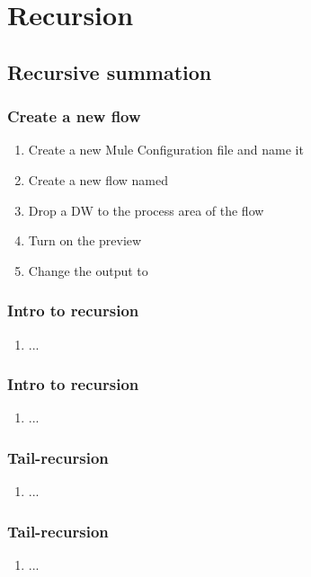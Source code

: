 \chapter{Recursion}


\section{Recursive summation}

\subsection{Create a new flow}
\begin{enumerate}
\item Create a new Mule Configuration file and name it 
\item Create a new flow named 
\item Drop a DW to the process area of the flow
\item Turn on the preview
\item Change the output to 
\end{enumerate}

\subsection{Intro to recursion}
\begin{enumerate}[resume*]
\item ...
\end{enumerate}

\subsection{Intro to recursion}
\begin{enumerate}[resume*]
\item ...
\end{enumerate}


\subsection{Tail-recursion}
\begin{enumerate}[resume*]
\item ...
\end{enumerate}

\subsection{Tail-recursion}
\begin{enumerate}[resume*]
\item ...
\end{enumerate}

